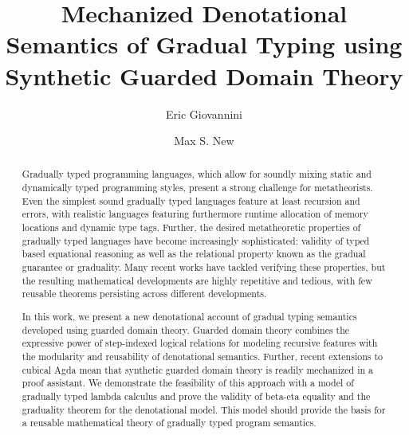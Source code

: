 \documentclass[sigconf,anonymous,review,screen]{acmart}
\begin{document}
\title{Mechanized Denotational Semantics of Gradual Typing using Synthetic Guarded Domain Theory}
\author{Eric Giovannini}

\author{Max S. New}

\begin{abstract}
  Gradually typed programming languages, which allow for soundly
  mixing static and dynamically typed programming styles, present a
  strong challenge for metatheorists. Even the simplest sound
  gradually typed languages feature at least recursion and errors,
  with realistic languages featuring furthermore runtime allocation of
  memory locations and dynamic type tags. Further, the desired
  metatheoretic properties of gradually typed languages have become
  increasingly sophisticated: validity of typed based equational
  reasoning as well as the relational property known as the gradual
  guarantee or graduality. Many recent works have tackled verifying
  these properties, but the resulting mathematical developments are
  highly repetitive and tedious, with few reusable theorems persisting
  across different developments.

  In this work, we present a new denotational account of gradual
  typing semantics developed using guarded domain theory. Guarded
  domain theory combines the expressive power of step-indexed logical
  relations for modeling recursive features with the modularity and
  reusability of denotational semantics. Further, recent extensions to
  cubical Agda mean that synthetic guarded domain theory is readily
  mechanized in a proof assistant. We demonstrate the feasibility of
  this approach with a model of gradually typed lambda calculus and
  prove the validity of beta-eta equality and the graduality theorem
  for the denotational model. This model should provide the basis for
  a reusable mathematical theory of gradually typed program semantics.
  

\end{abstract}
\end{document}
